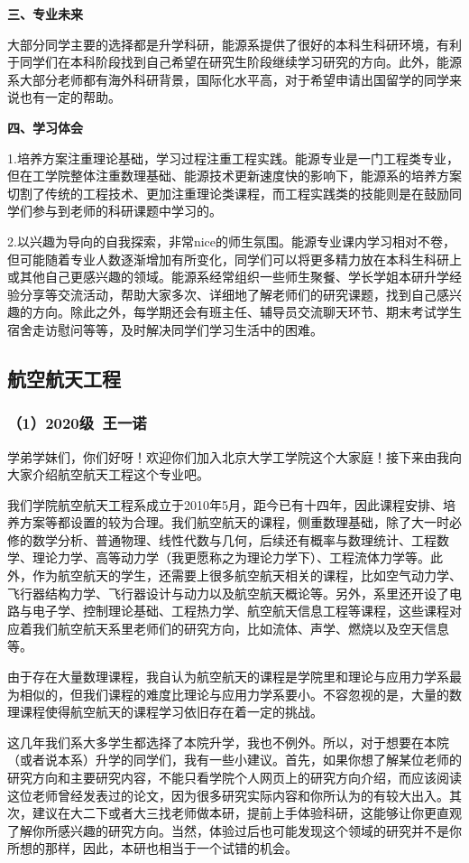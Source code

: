 \documentclass[11pt,oneside]{book}
\begin{document}
\textbf{三、专业未来}

大部分同学主要的选择都是升学科研，能源系提供了很好的本科生科研环境，有利于同学们在本科阶段找到自己希望在研究生阶段继续学习研究的方向。此外，能源系大部分老师都有海外科研背景，国际化水平高，对于希望申请出国留学的同学来说也有一定的帮助。

\textbf{四、学习体会}

1.培养方案注重理论基础，学习过程注重工程实践。能源专业是一门工程类专业，但在工学院整体注重数理基础、能源技术更新速度快的影响下，能源系的培养方案切割了传统的工程技术、更加注重理论类课程，而工程实践类的技能则是在鼓励同学们参与到老师的科研课题中学习的。

2.以兴趣为导向的自我探索，非常nice的师生氛围。能源专业课内学习相对不卷，但可能随着专业人数逐渐增加有所变化，同学们可以将更多精力放在本科生科研上或其他自己更感兴趣的领域。能源系经常组织一些师生聚餐、学长学姐本研升学经验分享等交流活动，帮助大家多次、详细地了解老师们的研究课题，找到自己感兴趣的方向。除此之外，每学期还会有班主任、辅导员交流聊天环节、期末考试学生宿舍走访慰问等等，及时解决同学们学习生活中的困难。


\subsection{航空航天工程}
\subsubsection{（1）2020级\ 王一诺}
学弟学妹们，你们好呀！欢迎你们加入北京大学工学院这个大家庭！接下来由我向大家介绍航空航天工程这个专业吧。

我们学院航空航天工程系成立于2010年5月，距今已有十四年，因此课程安排、培养方案等都设置的较为合理。我们航空航天的课程，侧重数理基础，除了大一时必修的数学分析、普通物理、线性代数与几何，后续还有概率与数理统计、工程数学、理论力学、高等动力学（我更愿称之为理论力学下）、工程流体力学等。此外，作为航空航天的学生，还需要上很多航空航天相关的课程，比如空气动力学、飞行器结构力学、飞行器设计与动力以及航空航天概论等。另外，系里还开设了电路与电子学、控制理论基础、工程热力学、航空航天信息工程等课程，这些课程对应着我们航空航天系里老师们的研究方向，比如流体、声学、燃烧以及空天信息等。

由于存在大量数理课程，我自认为航空航天的课程是学院里和理论与应用力学系最为相似的，但我们课程的难度比理论与应用力学系要小。不容忽视的是，大量的数理课程使得航空航天的课程学习依旧存在着一定的挑战。

这几年我们系大多学生都选择了本院升学，我也不例外。所以，对于想要在本院（或者说本系）升学的同学们，我有一些小建议。首先，如果你想了解某位老师的研究方向和主要研究内容，不能只看学院个人网页上的研究方向介绍，而应该阅读这位老师曾经发表过的论文，因为很多研究实际内容和你所认为的有较大出入。其次，建议在大二下或者大三找老师做本研，提前上手体验科研，这能够让你更直观了解你所感兴趣的研究方向。当然，体验过后也可能发现这个领域的研究并不是你所想的那样，因此，本研也相当于一个试错的机会。
\end{document}
